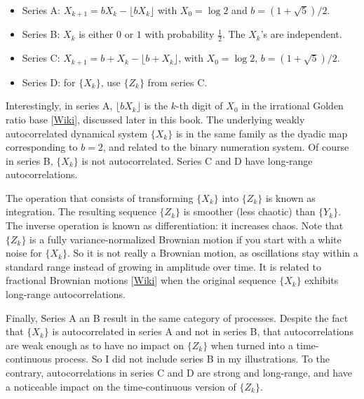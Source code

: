 \documentclass[oneside,10pt]{book}
\begin{document}
\begin{itemize}
\item[] Series A: $X_{k+1} = b X_k - \lfloor bX_k \rfloor$ with $X_0 = \log 2$ and $b = (1 + \sqrt{5})/2$.
\item[] Series B: $X_k$ is either $0$ or $1$ with probability $\frac{1}{2}$. The $X_k$'s are independent.
\item[] Series C: $X_{k+1} = b + X_k - \lfloor b + X_k \rfloor$, with $X_0 = \log 2$, $b = (1+\sqrt{5})/2$.
\item[] Series D: for $\{X_k\}$, use $\{Z_k\}$ from series C.
\end{itemize} \vspace{1ex}
 Interestingly, in series A,
 $\lfloor b X_k \rfloor$ is the $k$-th digit of $X_0$ in the irrational
\textcolor{index}{Golden ratio base} [\href{https://en.wikipedia.org/wiki/Golden_ratio_base}{Wiki}], discussed later in this book.  The underlying
 weakly autocorrelated dynamical system $\{X_k\}$ is in the same family as the
 \textcolor{index}{dyadic map} corresponding to $b=2$, and related to the binary numeration system. Of course in series B, $\{X_k\}$ is not autocorrelated. Series C and D have long-range autocorrelations.

The operation that consists of transforming $\{X_k\}$ into $\{Z_k\}$ is known as integration. The resulting sequence $\{Z_k\}$ is smoother (less chaotic) than
 $\{Y_k\}$. The inverse operation is known as differentiation: it increases chaos. Note that $\{Z_k\}$ is a fully variance-normalized Brownian motion if
 you start with a white noise for $\{X_k\}$. So it is not really a Brownian motion, as oscillations stay within a standard range instead of growing in amplitude over time. It is related to
\textcolor{index}{fractional Brownian motions}
[\href{https://en.wikipedia.org/wiki/Fractional_Brownian_motion}{Wiki}] when the original
 sequence $\{X_k\}$ exhibits long-range autocorrelations.

Finally, Series A an B result in the same category of processes.
Despite the fact that $\{X_k\}$ is autocorrelated in series A and not in series B, that autocorrelations are weak enough as to have no impact on $\{Z_k\}$ when turned into a time-continuous process. So I did not include series B in my illustrations. To the contrary,
 autocorrelations in series C and D are strong and long-range, and have a noticeable impact on the time-continuous version of
 $\{Z_k\}$.
\end{document}
